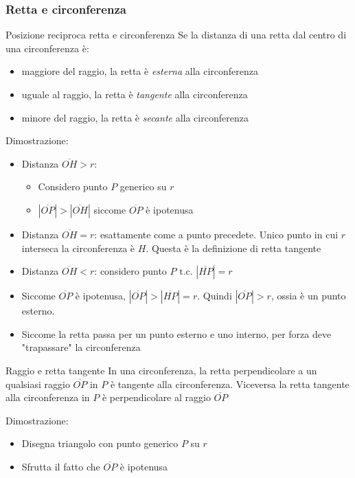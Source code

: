 \subsubsection{Retta e circonferenza}
\begin{teorema}{Posizione reciproca retta e circonferenza}
	Se la distanza di una retta dal centro di una circonferenza è:
	\begin{itemize}
		\item maggiore del raggio, la retta è \textit{esterna} alla circonferenza
		\item uguale al raggio, la retta è \textit{tangente} alla circonferenza
		\item minore del raggio, la retta è \textit{secante} alla circonferenza
	\end{itemize}
\end{teorema}
Dimostrazione:
\begin{itemize}
	\item Distanza $ \overline{OH} > r $:
	      \begin{itemize}
		      \item Considero punto $ P $ generico su $ r $
		      \item $ \left|\overline{OP}\right| > \left|\overline{OH}\right|$ siccome $ \overline{OP} $ è ipotenusa
	      \end{itemize}
	\item Distanza $ \overline{OH} = r $: esattamente come a punto precedete. Unico punto in cui $ r $ interseca la circonferenza è $ H $. Questa è la definizione di retta tangente
	\item Distanza $ \overline{OH} < r $: considero punto $ P \text{ t.c. } \left|\overline{HP}\right| = r $
	\item Siccome $ \overline{OP} $ è ipotenusa, $ \left|\overline{OP}\right| > \left|\overline{HP}\right| = r $. Quindi $ \left|\overline{OP}\right| > r $, ossia è un punto esterno.
	\item Siccome la retta passa per un punto esterno e uno interno, per forza deve "trapassare" la circonferenza
\end{itemize}
\begin{teorema}{Raggio e retta tangente}
	In una circonferenza, la retta perpendicolare a un qualsiasi raggio $ \overline{OP} $ in $ P $ è tangente alla circonferenza. Viceversa la retta tangente alla circonferenza in $ P $ è perpendicolare al raggio $ \overline{OP} $
\end{teorema}
Dimostrazione:
\begin{itemize}
	\item Disegna triangolo con punto generico $ P $ su $ r $
	\item Sfrutta il fatto che $ \overline{OP} $ è ipotenusa
\end{itemize}

